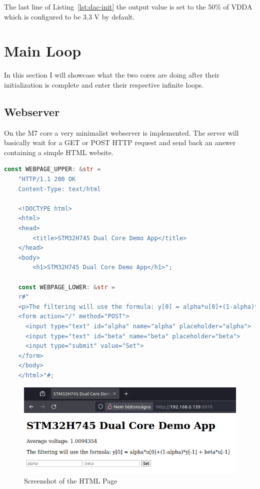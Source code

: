 The last line of Listing~\ref{lst:dac-init} the output value is set to the 50\% of VDDA which is configured to be 3.3 V by default.

\section{Main Loop}

In this section I will showcase what the two cores are doing after their initialization is complete and enter their respective infinite loops.

\subsection{Webserver}

On the M7 core a very minimalist webserver is implemented. The server will basically wait for a GET or POST HTTP request and send back an answer containing a simple HTML website.

\begin{lstlisting}[language=Rust,frame=single,float=!ht,style=customrust,label={lst:html-strings},caption={HTML Page Defined in a String}]
    const WEBPAGE_UPPER: &str =
    "HTTP/1.1 200 OK
    Content-Type: text/html

    <!DOCTYPE html>
    <html>
    <head>
        <title>STM32H745 Dual Core Demo App</title>
    </head>
    <body>
        <h1>STM32H745 Dual Core Demo App</h1>";

    const WEBPAGE_LOWER: &str =
    r#"
    <p>The filtering will use the formula: y[0] = alpha*u[0]+(1-alpha)*y[-1] + beta*u[-1]
    <form action="/" method="POST">
      <input type="text" id="alpha" name="alpha" placeholder="alpha">
      <input type="text" id="beta" name="beta" placeholder="beta">
      <input type="submit" value="Set">
    </form>
    </body>
    </html>"#;
\end{lstlisting}

\begin{figure}[!ht]
    \centering
    \includegraphics[width=150mm, keepaspectratio]{figures/webpage.png}
    \caption{Screenshot of the HTML Page}
    \label{fig:html-page}
\end{figure}


